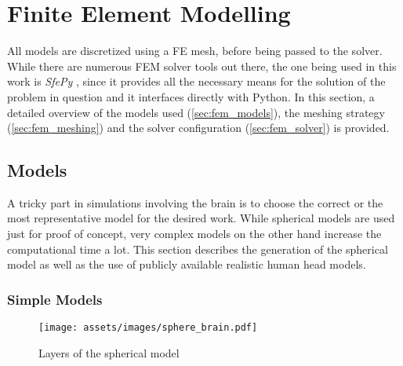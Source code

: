 \pagebreak
\chapter{Finite Element Modelling}

All models are discretized using a \gls{FE} mesh, before being passed to the solver. While there are numerous \gls{FEM} solver tools out there, the one being used in this work is \textit{SfePy} \cite{Cimrman2019}, since it provides all the necessary means for the solution of the problem in question and it interfaces directly with Python. In this section, a detailed overview of the models used (\autoref{sec:fem_models}), the meshing strategy (\autoref{sec:fem_meshing}) and the solver configuration (\autoref{sec:fem_solver}) is provided.

\section{Models}
\label{sec:fem_models}

A tricky part in simulations involving the brain is to choose the correct or the most representative model for the desired work. While spherical models are used just for proof of concept, very complex models on the other hand increase the computational time a lot. This section describes the generation of the spherical model as well as the use of publicly available realistic human head models.

\subsection{Simple Models}
\begin{wrapfigure}{r}{0.35\textwidth}
    \centering
    \texttt{[image: assets/images/sphere\_brain.pdf]}
    \caption{Layers of the spherical model}
    \vspace{-4cm}
    \label{fig:sphere_brain}
\end{wrapfigure}


